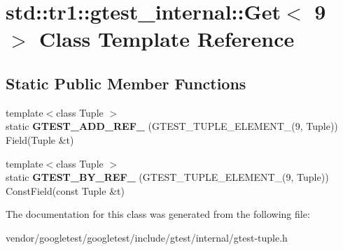 \hypertarget{classstd_1_1tr1_1_1gtest__internal_1_1Get_3_019_01_4}{}\section{std\+:\+:tr1\+:\+:gtest\+\_\+internal\+:\+:Get$<$ 9 $>$ Class Template Reference}
\label{classstd_1_1tr1_1_1gtest__internal_1_1Get_3_019_01_4}
\subsection*{Static Public Member Functions}
\begin{DoxyCompactItemize}
\item 
{\footnotesize template$<$class Tuple $>$ }\\static {\bfseries G\+T\+E\+S\+T\+\_\+\+A\+D\+D\+\_\+\+R\+E\+F\+\_\+} (G\+T\+E\+S\+T\+\_\+\+T\+U\+P\+L\+E\+\_\+\+E\+L\+E\+M\+E\+N\+T\+\_\+(9, Tuple)) Field(Tuple \&t)\hypertarget{classstd_1_1tr1_1_1gtest__internal_1_1Get_3_019_01_4_add31197dfdb381d265e221ed62129f45}{}\label{classstd_1_1tr1_1_1gtest__internal_1_1Get_3_019_01_4_add31197dfdb381d265e221ed62129f45}

\item 
{\footnotesize template$<$class Tuple $>$ }\\static {\bfseries G\+T\+E\+S\+T\+\_\+\+B\+Y\+\_\+\+R\+E\+F\+\_\+} (G\+T\+E\+S\+T\+\_\+\+T\+U\+P\+L\+E\+\_\+\+E\+L\+E\+M\+E\+N\+T\+\_\+(9, Tuple)) Const\+Field(const Tuple \&t)\hypertarget{classstd_1_1tr1_1_1gtest__internal_1_1Get_3_019_01_4_a5205e8da729e2bee446f5be0c65390af}{}\label{classstd_1_1tr1_1_1gtest__internal_1_1Get_3_019_01_4_a5205e8da729e2bee446f5be0c65390af}

\end{DoxyCompactItemize}


The documentation for this class was generated from the following file\+:\begin{DoxyCompactItemize}
\item 
vendor/googletest/googletest/include/gtest/internal/gtest-\/tuple.\+h\end{DoxyCompactItemize}
